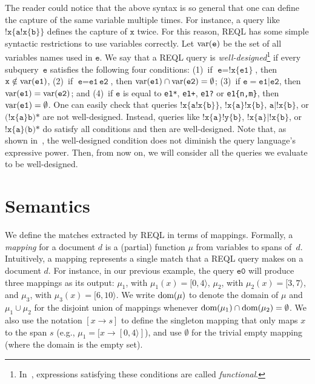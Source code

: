 The reader could notice that the above syntax is so general that one can define
the capture of the same variable multiple times. For instance, a query like
$\texttt{!x\{a!x\{b\}\}}$ defines the capture of $\texttt{x}$ twice. For this
reason, REQL has some simple syntactic restrictions to use variables correctly.
Let $\operatorname{var}(\texttt{e})$ be the set of all variables names used in $\texttt{e}$.
We say that a REQL query is \emph{well-designed}\footnote{In~\citet{FaginKRV15},
expressions satisfying these conditions are called \emph{functional}.} if every
subquery~$\texttt{e}$ satisfies the following four conditions: (1)~if
$\texttt{e}=\texttt{!x\{e1\}}$, then $\texttt{x} \notin \operatorname{var}(\texttt{e1})$,
(2)~if $\texttt{e} = \texttt{e1}\,\texttt{e2}$, then
$\operatorname{var}(\texttt{e1})\cap\operatorname{var}(\texttt{e2}) = \emptyset$; (3)~if $\texttt{e} =
\texttt{e1}|\texttt{e2}$, then $\operatorname{var}(\texttt{e1})=\operatorname{var}(\texttt{e2})$; and (4)~if
$\texttt{e}$ is equal to \texttt{e1*}, \texttt{e1+}, \texttt{e1?} or
\texttt{e1\{n,m\}}, then $\operatorname{var}(\texttt{e1}) = \emptyset$. One can easily check
that queries $\texttt{!x\{a!x\{b\}\}}$, $\texttt{!x\{a\}!x\{b\}}$,
$\texttt{a|!x\{b\}}$, or $\texttt{(!x\{a\}b)*}$ are not well-designed. Instead,
queries like $\texttt{!x\{a\}!y\{b\}}$, $\texttt{!x\{a\}|!x\{b\}}$, or
$\texttt{!x\{a\}(b)*}$ do satisfy all conditions and then are well-designed.
Note that, as shown in~\citet{FaginKRV15}, the well-designed condition does not
diminish the query language's expressive power. Then, from now on, we will
consider all the queries we evaluate to be well-designed.

\section{Semantics} 
We define the matches extracted by REQL in terms of mappings. Formally, a
\emph{mapping} for a document $d$ is a (partial) function $\mu$ from variables
to spans of~$d$. Intuitively, a mapping represents a single match that a REQL
query makes on a document $d$. For instance, in our previous example, the query
$\texttt{e0}$ will produce three mappings as its output: $\mu_1$, with $\mu_1(x)
= [0,4\rangle$, $\mu_2$, with $\mu_2(x) = [3,7\rangle$, and $\mu_3$, with
$\mu_3(x) = [6,10\rangle$. We write $\text{dom}(\mu)$ to denote the domain of $\mu$
and $\mu_1 \cup \mu_2$ for the disjoint union of mappings whenever $\text{dom}(\mu_1)
\cap \text{dom}(\mu_2) = \emptyset$. We also use the notation $[x \to s]$ to define
the singleton mapping that only maps $x$ to the span $s$ (e.g., $\mu_1 = [x \to
[0,4\rangle]$), and use $\emptyset$ for the trivial empty mapping (where the
domain is the empty set). 

